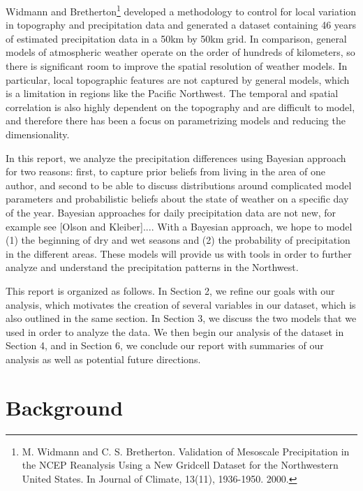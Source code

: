 \documentclass{article}
\begin{document}
Widmann and Bretherton\footnote{M. Widmann and C. S. Bretherton. Validation of Mesoscale Precipitation in the NCEP Reanalysis Using a New Gridcell Dataset for the Northwestern United States. In Journal of Climate, 13(11), 1936-1950. 2000.} developed a methodology to control for local variation in topography and precipitation data and generated a dataset containing 46 years of estimated precipitation data in a 50km by 50km grid.  In comparison, general models of atmospheric weather operate on the order of hundreds of kilometers, so there is significant room to improve the spatial resolution of weather models.  In particular, local topographic features are not captured by general models, which is a limitation in regions like the Pacific Northwest. The temporal and spatial correlation is also highly dependent on the topography and are difficult to model, and therefore there has been a focus on parametrizing models and reducing the dimensionality. 

In this report, we analyze the precipitation differences using Bayesian approach for two reasons: first, to capture prior beliefs  from living in the area of one author, and second to be able to discuss distributions around complicated model parameters and probabilistic beliefs about the state of weather on a specific day of the year. Bayesian approaches for daily precipitation data are not new, for example see [Olson and Kleiber].... With a Bayesian approach, we hope to model (1) the beginning of dry and wet seasons and (2) the probability of precipitation in the different areas. These models will provide us with tools in order to further analyze and understand the precipitation patterns in the Northwest. 

This report is organized as follows. In Section 2, we refine our goals with our analysis, which motivates the creation of several variables in our dataset, which is also outlined in the same section. In Section 3, we discuss the two models that we used in order to analyze the data.  We then begin our analysis of the dataset in Section 4, and in Section 6, we conclude our report with summaries of our analysis as well as potential future directions.

\section{Background}

\end{document}
